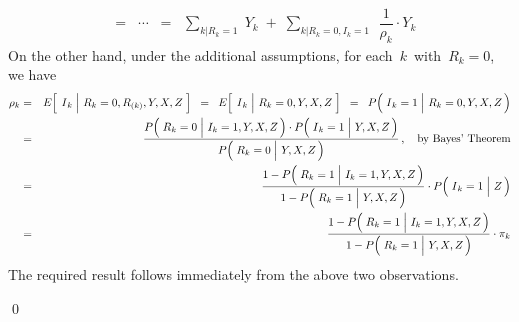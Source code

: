 \begin{enumerate}
\begin{eqnarray*}
	\;\; = \;\; \cdots \;\; = \;\;
		\underset{k\vert R_{k}=1}{\sum}\; Y_{k}
		\; + \;
		\underset{k\vert R_{k}=0,I_{k}=1}{\sum}\;\, \dfrac{1}{\rho_{k}} \cdot Y_{k}
	\end{eqnarray*}
	On the other hand, under the additional assumptions, for each \,$k$\, with \,$R_{k} = 0$,\, we have
	\begin{eqnarray*}
	\rho_{k}
	& = &
		E\!\left[\;\left.\overset{{\color{white}.}}{I}_{k}\;\right\vert\,R_{k}=0,R_{(k)},Y,X,Z\;\right]
	\;\; = \;\;
		E\!\left[\;\left.\overset{{\color{white}.}}{I}_{k}\;\right\vert\,R_{k}=0,Y,X,Z\;\right]
	\;\; = \;\;
		P\!\left(\,\left.\overset{{\color{white}.}}{I}_{k}=1\;\right\vert\,R_{k}=0,Y,X,Z\,\right)
	\\
	& = &
		\dfrac{
			P\!\left(\,\left.\overset{{\color{white}.}}{R}_{k}=0\;\right\vert\,I_{k}=1,Y,X,Z\,\right)
			\cdot
			P\!\left(\,\left.\overset{{\color{white}.}}{I}_{k}=1\;\right\vert\,Y,X,Z\,\right)
			}{
			P\!\left(\,\left.\overset{{\color{white}.}}{R}_{k}=0\;\right\vert\,Y,X,Z\,\right)
			}\,,
		\quad
		\textnormal{by Bayes' Theorem}
	\\
	& = &
		\dfrac{
			1 - P\!\left(\,\left.\overset{{\color{white}.}}{R}_{k}=1\;\right\vert\,I_{k}=1,Y,X,Z\,\right)
			}{
			1 - P\!\left(\,\left.\overset{{\color{white}.}}{R}_{k}=1\;\right\vert\,Y,X,Z\,\right)
			}
		\cdot
		P\!\left(\,\left.\overset{{\color{white}.}}{I}_{k}=1\;\right\vert\,Z\,\right)
	\\
	& = &
		\dfrac{
			1 - P\!\left(\,\left.\overset{{\color{white}.}}{R}_{k}=1\;\right\vert\,I_{k}=1,Y,X,Z\,\right)
			}{
			1 - P\!\left(\,\left.\overset{{\color{white}.}}{R}_{k}=1\;\right\vert\,Y,X,Z\,\right)
			}
		\cdot
		\pi_{k}
	\end{eqnarray*}
	The required result follows immediately from the above two observations.
\end{enumerate}
\qed



\renewcommand{\theenumi}{\roman{enumi}}
\renewcommand{\labelenumi}{\textnormal{(\theenumi)}$\;\;$}

